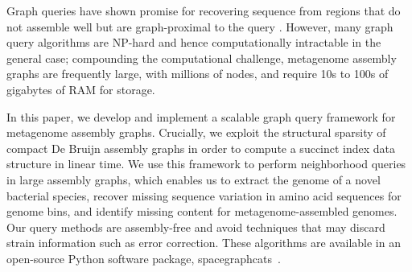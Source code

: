 Graph queries have shown promise for recovering sequence from regions that do
not assemble well but are graph-proximal to the query \cite{metacherchant,perchlorate}. However, many graph query
algorithms are NP-hard and hence computationally intractable in the
general case; compounding the computational challenge, metagenome assembly
graphs are frequently large, with millions of nodes, and require 10s
to 100s of gigabytes of RAM for storage.

In this paper, we develop and implement a scalable graph query
framework for metagenome assembly graphs. Crucially, we exploit the
structural sparsity of compact De Bruijn assembly graphs in order to
compute a succinct index data structure in linear time. We use this
framework to perform neighborhood queries in large assembly graphs,
which enables us to extract the genome of a novel bacterial species,
recover missing sequence variation in amino acid sequences for genome
bins, and identify missing content for metagenome-assembled genomes.
Our query methods are assembly-free and avoid techniques that may
discard strain information such as error correction.  These algorithms
are available in an open-source Python software package,
\textsf{spacegraphcats}~\cite{spacegraphcats}.


